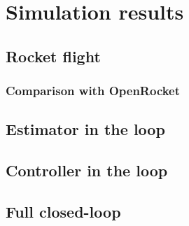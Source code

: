 \section{Simulation results}

\subsection{Rocket flight}
\subsubsection{Comparison with OpenRocket}

\subsection{Estimator in the loop}

\subsection{Controller in the loop}

\subsection{Full closed-loop}
